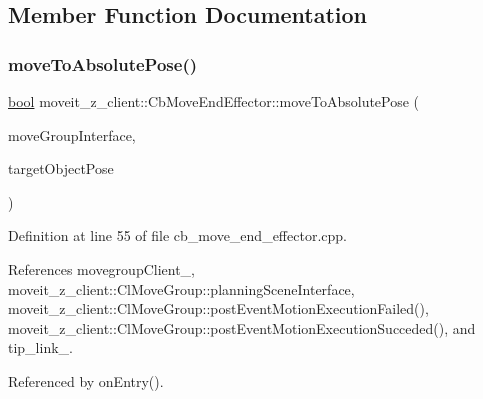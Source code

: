 \subsection{Member Function Documentation}
\mbox{\label{classmoveit__z__client_1_1CbMoveEndEffector_a277108330d114671ed89dffb876a8a48}} 
\subsubsection{\texorpdfstring{move\+To\+Absolute\+Pose()}{moveToAbsolutePose()}}
{\footnotesize\ttfamily \hyperlink{classbool}{bool} moveit\+\_\+z\+\_\+client\+::\+Cb\+Move\+End\+Effector\+::move\+To\+Absolute\+Pose (\begin{DoxyParamCaption}\item[{moveit\+::planning\+\_\+interface\+::\+Move\+Group\+Interface \&}]{move\+Group\+Interface,  }\item[{geometry\+\_\+msgs\+::\+Pose\+Stamped \&}]{target\+Object\+Pose }\end{DoxyParamCaption})\hspace{0.3cm}{\ttfamily [protected]}}



Definition at line 55 of file cb\+\_\+move\+\_\+end\+\_\+effector.\+cpp.



References movegroup\+Client\+\_\+, moveit\+\_\+z\+\_\+client\+::\+Cl\+Move\+Group\+::planning\+Scene\+Interface, moveit\+\_\+z\+\_\+client\+::\+Cl\+Move\+Group\+::post\+Event\+Motion\+Execution\+Failed(), moveit\+\_\+z\+\_\+client\+::\+Cl\+Move\+Group\+::post\+Event\+Motion\+Execution\+Succeded(), and tip\+\_\+link\+\_\+.



Referenced by on\+Entry().


